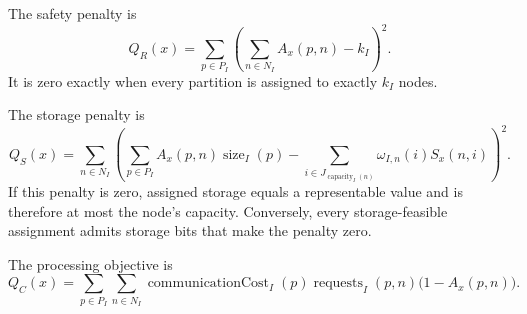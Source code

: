 \begin{definition}\label{def:safety-penalty}
The safety penalty is
\[
  Q_R(x)=\sum_{p\in P_I}
    \left(\sum_{n\in N_I} A_x(p,n)-k_I\right)^2.
\]
It is zero exactly when every partition is assigned to exactly $k_I$ nodes.
\end{definition}

\begin{definition}\label{def:storage-penalty}
The storage penalty is
\[
  Q_S(x)=\sum_{n\in N_I}
  \left(
    \sum_{p\in P_I} A_x(p,n)\operatorname{size}_I(p)
    -\sum_{i\in J_{\operatorname{capacity}_I(n)}}
       \omega_{I,n}(i)S_x(n,i)
  \right)^2.
\]
If this penalty is zero, assigned storage equals a representable value and is
therefore at most the node's capacity. Conversely, every storage-feasible
assignment admits storage bits that make the penalty zero.
\end{definition}

\begin{definition}\label{def:processing-objective}
The processing objective is
\[
  Q_C(x)=\sum_{p\in P_I}\sum_{n\in N_I}
    \operatorname{communicationCost}_I(p)
    \operatorname{requests}_I(p,n)
    \bigl(1-A_x(p,n)\bigr).
\]
\end{definition}

